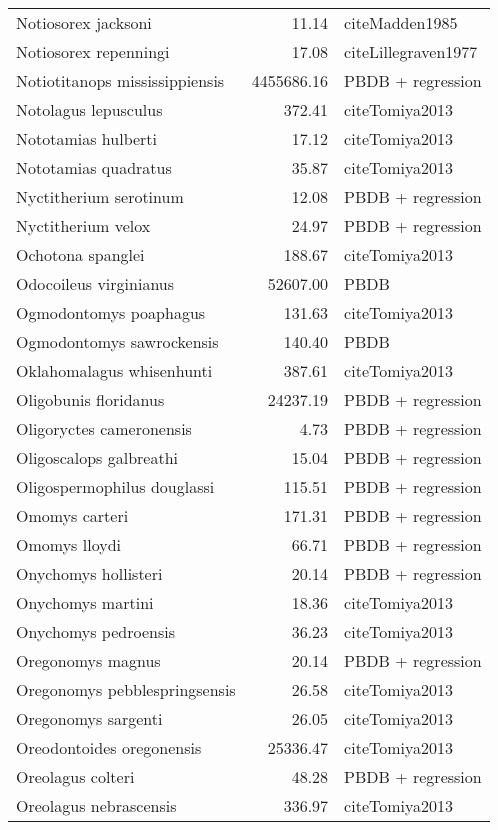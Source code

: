 \begin{table}[ht]
\begin{tabular}{lrl}
  Notiosorex jacksoni & 11.14 & cite{Madden1985} \\ 
  Notiosorex repenningi & 17.08 & cite{Lillegraven1977} \\ 
  Notiotitanops mississippiensis & 4455686.16 & PBDB + regression \\ 
  Notolagus lepusculus & 372.41 & cite{Tomiya2013} \\ 
  Nototamias hulberti & 17.12 & cite{Tomiya2013} \\ 
  Nototamias quadratus & 35.87 & cite{Tomiya2013} \\ 
  Nyctitherium serotinum & 12.08 & PBDB + regression \\ 
  Nyctitherium velox & 24.97 & PBDB + regression \\ 
  Ochotona spanglei & 188.67 & cite{Tomiya2013} \\ 
  Odocoileus virginianus & 52607.00 & PBDB \\ 
  Ogmodontomys poaphagus & 131.63 & cite{Tomiya2013} \\ 
  Ogmodontomys sawrockensis & 140.40 & PBDB \\ 
  Oklahomalagus whisenhunti & 387.61 & cite{Tomiya2013} \\ 
  Oligobunis floridanus & 24237.19 & PBDB + regression \\ 
  Oligoryctes cameronensis & 4.73 & PBDB + regression \\ 
  Oligoscalops galbreathi & 15.04 & PBDB + regression \\ 
  Oligospermophilus douglassi & 115.51 & PBDB + regression \\ 
  Omomys carteri & 171.31 & PBDB + regression \\ 
  Omomys lloydi & 66.71 & PBDB + regression \\ 
  Onychomys hollisteri & 20.14 & PBDB + regression \\ 
  Onychomys martini & 18.36 & cite{Tomiya2013} \\ 
  Onychomys pedroensis & 36.23 & cite{Tomiya2013} \\ 
  Oregonomys magnus & 20.14 & PBDB + regression \\ 
  Oregonomys pebblespringsensis & 26.58 & cite{Tomiya2013} \\ 
  Oregonomys sargenti & 26.05 & cite{Tomiya2013} \\ 
  Oreodontoides oregonensis & 25336.47 & cite{Tomiya2013} \\ 
  Oreolagus colteri & 48.28 & PBDB + regression \\ 
  Oreolagus nebrascensis & 336.97 & cite{Tomiya2013} \\ 

\end{tabular}
\end{table}
